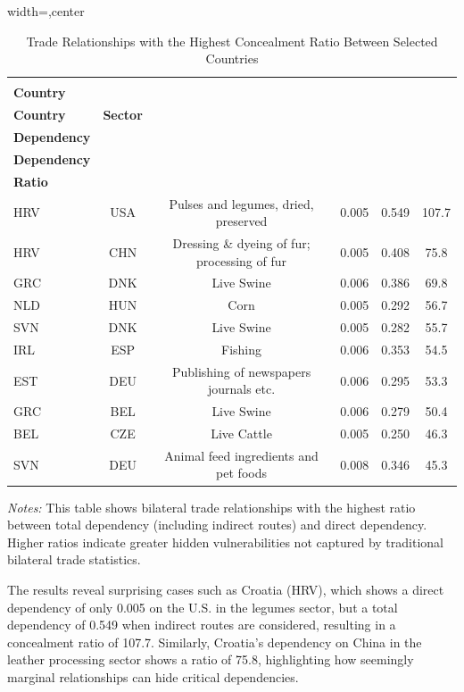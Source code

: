 \documentclass[final,1p,times,authoryear]{elsarticle}
\begin{document}
\begin{table}[!t]
\centering
\caption{Trade Relationships with the Highest Concealment Ratio Between Selected Countries}
\label{tab:concealment_ratio}
\footnotesize
\renewcommand{\arraystretch}{1.1}
\begin{adjustbox}{width=\textwidth,center}
\begin{tabular}{@{}lccccc@{}}
\toprule
\makecell{\textbf{Importing}\\\textbf{Country}} & \makecell{\textbf{Exporting}\\\textbf{Country}} & \textbf{Sector} & \makecell{\textbf{Direct}\\\textbf{Dependency}} & \makecell{\textbf{Total}\\\textbf{Dependency}} & \makecell{\textbf{Concealment}\\\textbf{Ratio}} \\
\midrule
HRV & USA & Pulses and legumes, dried, preserved & 0.005 & 0.549 & 107.7 \\
HRV & CHN & Dressing \& dyeing of fur; processing of fur & 0.005 & 0.408 & 75.8 \\
GRC & DNK & Live Swine & 0.006 & 0.386 & 69.8 \\
NLD & HUN & Corn & 0.005 & 0.292 & 56.7 \\
SVN & DNK & Live Swine & 0.005 & 0.282 & 55.7 \\
IRL & ESP & Fishing & 0.006 & 0.353 & 54.5 \\
EST & DEU & Publishing of newspapers journals etc. & 0.006 & 0.295 & 53.3 \\
GRC & BEL & Live Swine & 0.006 & 0.279 & 50.4 \\
BEL & CZE & Live Cattle & 0.005 & 0.250 & 46.3 \\
SVN & DEU & Animal feed ingredients and pet foods & 0.008 & 0.346 & 45.3 \\
\bottomrule
\end{tabular}
\end{adjustbox}
\begin{tablenotes}
\scriptsize
\item \textit{Notes:} This table shows bilateral trade relationships with the highest ratio between total dependency (including indirect routes) and direct dependency. Higher ratios indicate greater hidden vulnerabilities not captured by traditional bilateral trade statistics.
\end{tablenotes}
\end{table}

The results reveal surprising cases such as Croatia (HRV), which shows a direct dependency of only 0.005 on the U.S. in the legumes sector, but a total dependency of 0.549 when indirect routes are considered, resulting in a concealment ratio of 107.7. Similarly, Croatia's dependency on China in the leather processing sector shows a ratio of 75.8, highlighting how seemingly marginal relationships can hide critical dependencies.
\end{document}
